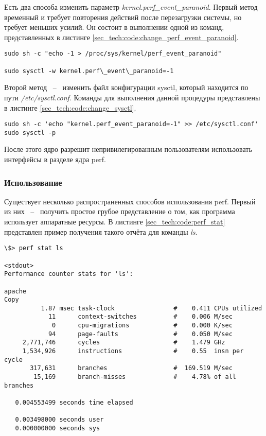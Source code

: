 Есть два способа изменить параметр \textit{kernel.perf\_event\_paranoid}.
Первый метод временный и требует повторения действий после перезагрузки системы, но требует меньших усилий.
Он состоит в выполнении одной из команд, представленных в листинге \ref{sec_tech:code:change_perf_event_paranoid}.

\begin{lstlisting}[style=CodeListing, label=sec_tech:code:change_perf_event_paranoid, caption={Способы изменения параметра}]
sudo sh -c "echo -1 > /proc/sys/kernel/perf_event_paranoid"

sudo sysctl -w kernel.perf\_event\_paranoid=-1
\end{lstlisting}

Второй метод ~--~ изменить файл конфигурации sysctl, который находится по пути \textit{/etc/sysctl.conf}.
Команды для выполнения данной процедуры представлены в листинге \ref{sec_tech:code:change_sysctl}.

\begin{lstlisting}[style=CodeListing, label=sec_tech:code:change_sysctl, caption={Правка файла конфигурации sysctl}]
sudo sh -c 'echo "kernel.perf_event_paranoid=-1" >> /etc/sysctl.conf'
sudo sysctl -p
\end{lstlisting}

После этого ядро разрешит непривилегированным пользователям использовать интерфейсы в разделе ядра perf.

\subsubsection{Использование} 

Существует несколько распространенных способов использования perf. 
Первый из них ~--~ получить простое грубое представление о том, как программа использует аппаратные ресурсы.
В листинге \ref{sec_tech:code:perf_stat} представлен пример получения такого отчёта для команды \textit{ls}.

\pagebreak
\begin{lstlisting}[style=CodeListing, label=sec_tech:code:perf_stat, caption={Пример использования команды perf stat}]
\$> perf stat ls

<stdout>
Performance counter stats for 'ls':

apache
Copy
          1.87 msec task-clock                #    0.411 CPUs utilized
            11      context-switches          #    0.006 M/sec
             0      cpu-migrations            #    0.000 K/sec
            94      page-faults               #    0.050 M/sec
     2,771,746      cycles                    #    1.479 GHz
     1,534,926      instructions              #    0.55  insn per cycle
       317,631      branches                  #  169.519 M/sec
        15,169      branch-misses             #    4.78% of all branches

   0.004553499 seconds time elapsed

   0.003498000 seconds user
   0.000000000 seconds sys
\end{lstlisting}

